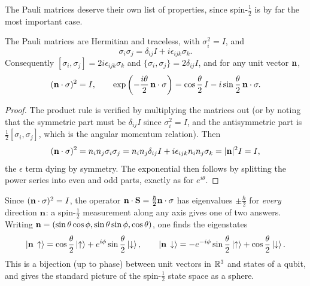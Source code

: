 \documentclass[a4paper]{scrartcl}
\begin{document}
The Pauli matrices deserve their own list of properties, since spin-$\frac12$ is by far the most important case.

\begin{proposition}
    The Pauli matrices are Hermitian and traceless, with $\sigma_i^2 = I$, and
    $$
    \sigma_i \sigma_j = \delta_{ij} I + i \epsilon_{ijk}\sigma_k.
    $$
    Consequently $[\sigma_i,\sigma_j] = 2i\epsilon_{ijk}\sigma_k$ and $\{\sigma_i,\sigma_j\} = 2\delta_{ij}I$, and for any unit vector $\mathbf{n}$,
    $$
    (\mathbf{n}\cdot\mathbf{\sigma})^2 = I, \qquad \exp\left( -\frac{i\theta}{2}\,\mathbf{n}\cdot\mathbf{\sigma} \right) = \cos\frac{\theta}{2}\, I - i \sin\frac{\theta}{2}\, \mathbf{n}\cdot\mathbf{\sigma}.
    $$
\end{proposition}
\begin{proof}
    The product rule is verified by multiplying the matrices out (or by noting that the symmetric part must be $\delta_{ij}I$ since $\sigma_i^2 = I$, and the antisymmetric part is $\frac12[\sigma_i,\sigma_j]$, which is the angular momentum relation). Then
    $$
    (\mathbf{n}\cdot\mathbf{\sigma})^2 = n_in_j\sigma_i\sigma_j = n_in_j\delta_{ij}I + i\epsilon_{ijk}n_in_j\sigma_k = \lvert\mathbf{n}\rvert^2 I = I,
    $$
    the $\epsilon$ term dying by symmetry. The exponential then follows by splitting the power series into even and odd parts, exactly as for $e^{i\theta}$.
\end{proof}

Since $(\mathbf{n} \cdot \mathbf{\sigma})^2 = I$, the operator $\mathbf{n}\cdot\mathbf{S} = \frac{\hbar}{2}\mathbf{n} \cdot \mathbf{\sigma}$ has eigenvalues $\pm\frac\hbar2$ for \emph{every} direction $\mathbf{n}$: a spin-$\frac12$ measurement along any axis gives one of two answers. Writing $\mathbf{n} = (\sin\theta\cos\phi, \sin\theta\sin\phi,\cos\theta)$, one finds the eigenstates
$$
\ket{\mathbf{n} \,\uparrow} = \cos\frac\theta2 \ket\uparrow + e^{i\phi}\sin\frac\theta2\ket\downarrow, \qquad
\ket{\mathbf{n} \,\downarrow} = -e^{-i\phi}\sin\frac\theta2 \ket\uparrow + \cos\frac\theta2\ket\downarrow.
$$
This is a bijection (up to phase) between unit vectors in $\mathbb{R}^3$ and states of a qubit, and gives the standard picture of the spin-$\frac12$ state space as a sphere.
\end{document}
